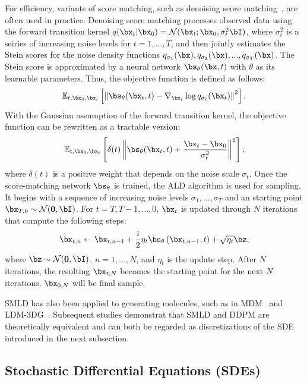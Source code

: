 For efficiency, variants of score matching, such as denoising score matching~\citep{DenoisingScoreMatching},
are often used in practice.
Denoising score matching processes observed data using the forward transition kernel $q(\bx_t|\bx_0) = \mathcal{N}(\bx_t; \bx_0, \sigma_t^2 \bI)$, where $\sigma_t^2$ is a seiries of increasing noise levels for $t = 1, \ldots, T$, and then jointly estimates the Stein scores for the noise density functions $q_{\sigma_1}(\bx), q_{\sigma_2}(\bx), ..., q_{\sigma_T}(\bx)$.
The Stein score is approximated by a neural network $\bs_\theta(\bx, t)$ with $\theta$ as its learnable parameters. Thus, the objective function is defined as follows: 
\begin{equation}
\mathbb{E}_{t, \bx_0, \bx_t} \left[ \left\| \bs_\theta(\bx_t, t) - \nabla_{\bx_t} \log q_{\sigma_t}(\bx_t) \right\|^2 \right]. 
\end{equation}
With the Gaussian assumption of the forward transition kernel, the objective function can be rewritten as a tractable version: 
\begin{equation}
\mathbb{E}_{t, \bx_0, \bx_t} \left[ \delta(t) \left\| \bs_\theta(\bx_t, t) + \frac{\bx_t - \bx_0}{\sigma_t^2} \right\|^2 \right], 
\end{equation}
where $\delta(t)$ is a positive weight that depends on the noise scale $\sigma_t$. Once the score-matching network $\bs_\theta$ is trained, the ALD algorithm is used for sampling. It begins with a sequence of increasing noise levels $\sigma_1, \ldots, \sigma_T$ and an starting point \(\bx_{T,0} \sim \mathcal{N}(\mathbf{0}, \bI)\). For \(t = T, T - 1, \ldots, 0\), \(\bx_t\) is updated through \(N\) iterations that compute the following steps:
\begin{equation}
\bx_{t,n} \leftarrow \bx_{t,n-1} + \frac{1}{2} \eta_t \bs_\theta \left( \bx_{t,n-1}, t \right) + \sqrt{\eta_t} \bz, 
\end{equation}
where $\bz \sim \mathcal{N}(\mathbf{0}, \bI)$, $n = 1, \dots, N$, and $\eta_t$ is the update step. After $N$ iterations, the resulting $\bx_{t,N}$ becomes the starting point for the next $N$ iterations. $\bx_{0,N}$ will be final sample. 

SMLD has also been applied to generating molecules, such as in MDM~\citep{MDM} and LDM-3DG~\citep{LDM-3DG}. Subsequent studies demonstrat that SMLD and DDPM are theoretically equivalent and can both be regarded as discretizations of the SDE introduced in the next subsection.


\subsection{Stochastic Differential Equations (SDEs)}

